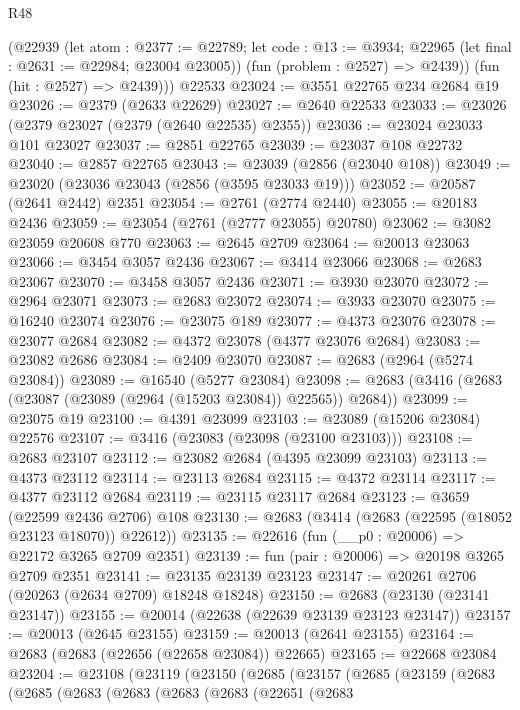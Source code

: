 \begin{lexlean}{R48}
\begin{coremodule}
        (@22939
          (let atom : @2377 := @22789;
          let code : @13 := @3934; @22965 (let final : @2631 := @22984; @23004 @23005))
          (fun (problem : @2527) => @2439))
        (fun (hit : @2527) => @2439)))
    @22533
@23024 := @3551 @22765 @234 @2684 @19
@23026 := @2379 (@2633 @22629)
@23027 := @2640 @22533
@23033 := @23026 (@2379 @23027 (@2379 (@2640 @22535) @2355))
@23036 := @23024 @23033 @101 @23027
@23037 := @2851 @22765
@23039 := @23037 @108 @22732
@23040 := @2857 @22765
@23043 := @23039 (@2856 (@23040 @108))
@23049 := @23020 (@23036 @23043 (@2856 (@3595 @23033 @19)))
@23052 := @20587 (@2641 @2442) @2351
@23054 := @2761 (@2774 @2440)
@23055 := @20183 @2436
@23059 := @23054 (@2761 (@2777 @23055) @20780)
@23062 := @3082 @23059 @20608 @770
@23063 := @2645 @2709
@23064 := @20013 @23063
@23066 := @3454 @3057 @2436
@23067 := @3414 @23066
@23068 := @2683 @23067
@23070 := @3458 @3057 @2436
@23071 := @3930 @23070
@23072 := @2964 @23071
@23073 := @2683 @23072
@23074 := @3933 @23070
@23075 := @16240 @23074
@23076 := @23075 @189
@23077 := @4373 @23076
@23078 := @23077 @2684
@23082 := @4372 @23078 (@4377 @23076 @2684)
@23083 := @23082 @2686
@23084 := @2409 @23070
@23087 := @2683 (@2964 (@5274 @23084))
@23089 := @16540 (@5277 @23084)
@23098 := @2683 (@3416 (@2683 (@23087 (@23089 (@2964 (@15203 @23084)) @22565)) @2684))
@23099 := @23075 @19
@23100 := @4391 @23099
@23103 := @23089 (@15206 @23084) @22576
@23107 := @3416 (@23083 (@23098 (@23100 @23103)))
@23108 := @2683 @23107
@23112 := @23082 @2684 (@4395 @23099 @23103)
@23113 := @4373 @23112
@23114 := @23113 @2684
@23115 := @4372 @23114
@23117 := @4377 @23112 @2684
@23119 := @23115 @23117 @2684
@23123 := @3659 (@22599 @2436 @2706) @108
@23130 := @2683 (@3414 (@2683 (@22595 (@18052 @23123 @18070)) @22612))
@23135 := @22616 (fun (__p0 : @20006) => @22172 @3265 @2709 @2351)
@23139 := fun (pair : @20006) => @20198 @3265 @2709 @2351
@23141 := @23135 @23139 @23123
@23147 := @20261 @2706 (@20263 (@2634 @2709) @18248 @18248)
@23150 := @2683 (@23130 (@23141 @23147))
@23155 := @20014 (@22638 (@22639 @23139 @23123 @23147))
@23157 := @20013 (@2645 @23155)
@23159 := @20013 (@2641 @23155)
@23164 := @2683 (@2683 (@22656 (@22658 @23084)) @22665)
@23165 := @22668 @23084
@23204 := @23108
    (@23119
      (@23150
        (@2685
          (@23157
            (@2685
              (@23159
                (@2683
                  (@2685
                    (@2683
                      (@2683
                        (@2683
                          (@2683
                            (@22651
                              (@2683

\end{coremodule}
\end{lexlean}
